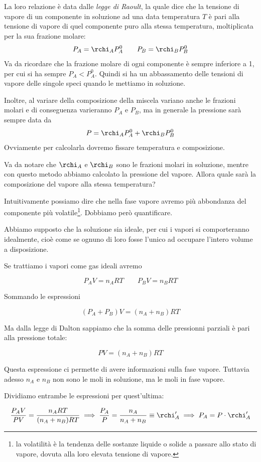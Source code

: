 La loro relazione è data dalle \textit{legge di Raoult}, la quale dice che la tensione di vapore di un componente in soluzione ad una data temperatura $T$ è pari alla tensione di vapore di quel componente puro alla stessa temperatura, moltiplicata per la sua frazione molare:
$$P_A=\rchi_A P^0_A \qquad P_B=\rchi_B P^0_B$$
Va da ricordare che la frazione molare di ogni componente è sempre inferiore a 1, per cui si ha sempre $P_A < P^0_A$. Quindi si ha un abbassamento delle tensioni di vapore delle singole speci quando le mettiamo in soluzione.

Inoltre, al variare della composizione della miscela variano anche le frazioni molari e di conseguenza varieranno $P_A$ e $P_B$, ma in generale la pressione sarà sempre data da
$$P=\rchi_A P^0_A + \rchi_B P^0_B$$
Ovviamente per calcolarla dovremo fissare temperatura e composizione.

Va da notare che $\rchi_A$ e $\rchi_B$ sono le frazioni molari in soluzione, mentre con questo metodo abbiamo calcolato la pressione del vapore. Allora quale sarà la composizione del vapore alla stessa temperatura?

Intuitivamente possiamo dire che nella fase vapore avremo più abbondanza del componente più volatile\footnote{la volatilità è la tendenza delle sostanze liquide o solide a passare allo stato di vapore, dovuta alla loro elevata tensione di vapore.}. Dobbiamo però quantificare.

Abbiamo supposto che la soluzione sia ideale, per cui i vapori si comporteranno idealmente, cioè come se ognuno di loro fosse l'unico ad occupare l'intero volume a disposizione.

Se trattiamo i vapori come gas ideali avremo

$$P_AV=n_ART
\qquad
P_BV=n_BRT$$

Sommando le espressioni

$$(P_A + P_B)V= (n_A + n_B)RT$$

Ma dalla legge di Dalton sappiamo che la somma delle pressionni parziali è pari alla pressione totale:

$$PV=(n_A + n_B)RT$$

Questa espressione ci permette di avere informazioni sulla fase vapore. Tuttavia adesso $n_A$ e $n_B$ non sono le moli in soluzione, ma le moli in fase vapore.

Dividiamo entrambe le espressioni per quest'ultima:

$$\frac{P_AV}{PV}= \frac{n_ART}{(n_A + n_B)RT}
\implies
\frac{P_A}{P} = \frac{n_A}{n_A + n_B}\equiv \rchi '_A
\implies
P_A=P \cdot \rchi '_A$$

